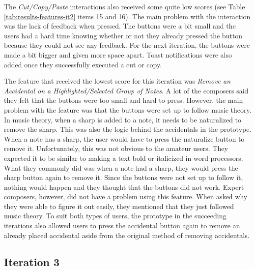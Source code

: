 			The \textit{Cut/Copy/Paste} interactions also received some quite low scores (see Table \ref{tab:results-features-it2} items 15 and 16). The main problem with the interaction was the lack of feedback when pressed. The buttons were a bit small and the users had a hard time knowing whether or not they already pressed the button because they could not see any feedback. For the next iteration, the buttons were made a bit bigger and given more space apart. Toast notifications were also added once they successfully executed a cut or copy. 

			The feature that received the lowest score for this iteration was \textit{Remove an Accidental on a Highlighted/Selected Group of Notes}. A lot of the composers said they felt that the buttons were too small and hard to press. However, the main problem with the feature was that the buttons were set up to follow music theory. In music theory, when a sharp is added to a note, it needs to be naturalized to remove the sharp. This was also the logic behind the accidentals in the prototype. When a note has a sharp, the user would have to press the naturalize button to remove it. Unfortunately, this was not obvious to the amateur users. They expected it to be similar to making a text bold or italicized in word processors. What they commonly did was when a note had a sharp, they would press the sharp button again to remove it. Since the buttons were not set up to follow it, nothing would happen and they thought that the buttons did not work. Expert composers, however, did not have a problem using this feature. When asked why they were able to figure it out easily, they mentioned that they just followed music theory. To suit both types of users, the prototype in the succeeding iterations also allowed users to press the accidental button again to remove an already placed accidental aside from the original method of removing accidentals.

		\subsection{Iteration 3} %
		\label{sub:iteration_3}
		
